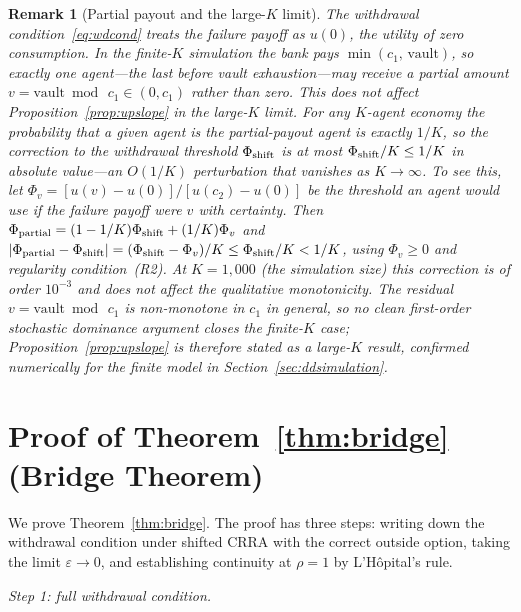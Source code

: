 \documentclass[12pt]{article}\usepackage[]{graphicx}\usepackage[]{xcolor}
\newtheorem{remark}{Remark}
\begin{document}
\begin{remark}[Partial payout and the large-$K$ limit]
\label{rem:partialpayout}
The withdrawal condition~\eqref{eq:wdcond} treats the failure payoff as $u(0)$, the utility of zero consumption.
In the finite-$K$ simulation the bank pays $\min(c_1,\,\text{vault})$, so exactly one agent---the last before vault exhaustion---may receive a partial amount $v = \text{vault} \bmod\, c_1 \in (0, c_1)$ rather than zero.
This does not affect Proposition~\ref{prop:upslope} in the large-$K$ limit.
For any $K$-agent economy the probability that a given agent is the partial-payout agent is exactly $1/K$, so the correction to the withdrawal threshold $\Phi_{\rm shift}$ is at most $\Phi_{\rm shift}/K \leq 1/K$ in absolute value---an $O(1/K)$ perturbation that vanishes as $K \to \infty$.
To see this, let $\Phi_v = [u(v)-u(0)]/[u(c_2)-u(0)]$ be the threshold an agent would use if the failure payoff were $v$ with certainty.
Then $\Phi_{\rm partial} = (1-1/K)\Phi_{\rm shift} + (1/K)\Phi_v$ and $|\Phi_{\rm partial}-\Phi_{\rm shift}| = (\Phi_{\rm shift}-\Phi_v)/K \leq \Phi_{\rm shift}/K < 1/K$, using $\Phi_v \geq 0$ and regularity condition~(R2).
At $K = 1{,}000$ (the simulation size) this correction is of order $10^{-3}$ and does not affect the qualitative monotonicity.
The residual $v = \text{vault} \bmod\, c_1$ is non-monotone in $c_1$ in general, so no clean first-order stochastic dominance argument closes the finite-$K$ case; Proposition~\ref{prop:upslope} is therefore stated as a large-$K$ result, confirmed numerically for the finite model in Section~\ref{sec:ddsimulation}.
\end{remark}

\section{Proof of Theorem~\ref{thm:bridge} (Bridge Theorem)}
\label{app:proofB}

We prove Theorem~\ref{thm:bridge}.
The proof has three steps: writing down the withdrawal condition under shifted CRRA with the correct outside option, taking the limit $\varepsilon \to 0$, and establishing continuity at $\rho = 1$ by L'H\^opital's rule.

\medskip

\noindent\textit{Step 1: full withdrawal condition.}
\end{document}
